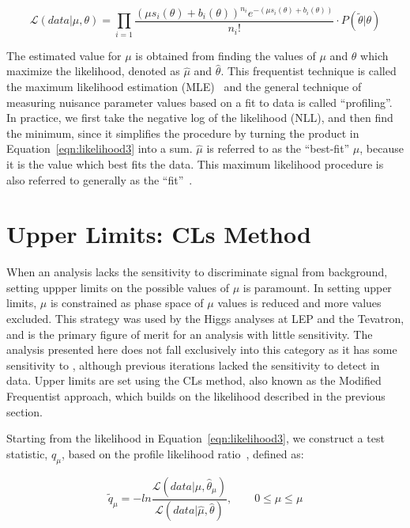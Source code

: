 \begin{equation}
\label{eqn:likelihood3}
\mathcal{L}(data|\mu,\theta) = \prod_{i=1} \frac{(\mu s_{i}(\theta)+b_{i}(\theta))^{n_{i}}e^{-(\mu s_{i}(\theta)+b_{i}(\theta))}}{n_{i}!} \cdot P(\tilde{\theta}|\theta)
\end{equation}

\noindent The estimated value for $\mu$ is obtained from finding the values of $\mu$ and $\theta$ which maximize the likelihood, denoted as $\hat{\mu}$ and $\hat{\theta}$.
This frequentist technique is called the maximum likelihood estimation (MLE)~\cite{lista} and the general technique of measuring nuisance parameter values based on a fit
to data is called ``profiling''.
In practice, we first take the negative log of the likelihood (NLL), and then find the minimum, since it simplifies
the procedure by turning the product in Equation~\ref{eqn:likelihood3} into a sum. $\hat{\mu}$ is referred to as the ``best-fit'' $\mu$, because it is the value which best fits the data.
This maximum likelihood procedure is also referred to generally as the ``fit''~\cite{CMS-AN-11-298}. 

\section{Upper Limits: CLs Method}
\label{sec:limit}
When an analysis lacks the sensitivity to discriminate signal from background, setting uppper limits on the possible values of $\mu$ is paramount. In setting upper
limits, $\mu$ is constrained as phase space of $\mu$ values is reduced and more values excluded. This strategy was used by the Higgs analyses at LEP and the Tevatron, and is the primary figure of merit
for an analysis with little sensitivity.
The \tth analysis presented here does not fall exclusively into this category as it has some sensitivity to \tth, although previous iterations lacked the sensitivity
to detect \tth in data. Upper limits are set using the CLs method, also known as the
Modified Frequentist approach, which builds on the likelihood described in the previous section. 

Starting from the likelihood in Equation~\ref{eqn:likelihood3}, we construct a test statistic, $q_{\mu}$, based on the profile likelihood ratio~\cite{AsymptoticLimits},
defined as:

\begin{equation}
\label{eqn:test_stat}
\tilde{q}_{\mu} = -ln \frac{\mathcal{L}(data|\mu,\hat{\theta}_{\mu})}{\mathcal{L}(data|\hat{\mu},\hat{\theta})},~~~~~~~~~0 \leq \hat{\mu} \leq{\mu}
\end{equation}

